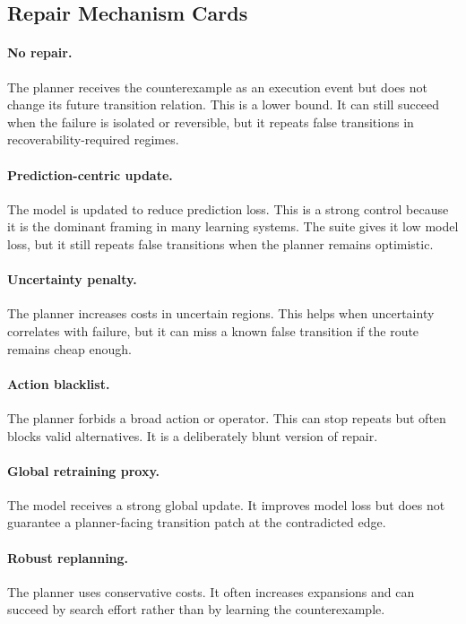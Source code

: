 \documentclass{article}
\begin{document}
\subsection{Repair Mechanism Cards}

\paragraph{No repair.}
The planner receives the counterexample as an execution event but does not
change its future transition relation. This is a lower bound. It can still
succeed when the failure is isolated or reversible, but it repeats false
transitions in recoverability-required regimes.

\paragraph{Prediction-centric update.}
The model is updated to reduce prediction loss. This is a strong control
because it is the dominant framing in many learning systems. The suite gives it
low model loss, but it still repeats false transitions when the planner remains
optimistic.

\paragraph{Uncertainty penalty.}
The planner increases costs in uncertain regions. This helps when uncertainty
correlates with failure, but it can miss a known false transition if the route
remains cheap enough.

\paragraph{Action blacklist.}
The planner forbids a broad action or operator. This can stop repeats but often
blocks valid alternatives. It is a deliberately blunt version of repair.

\paragraph{Global retraining proxy.}
The model receives a strong global update. It improves model loss but does not
guarantee a planner-facing transition patch at the contradicted edge.

\paragraph{Robust replanning.}
The planner uses conservative costs. It often increases expansions and can
succeed by search effort rather than by learning the counterexample.
\end{document}
